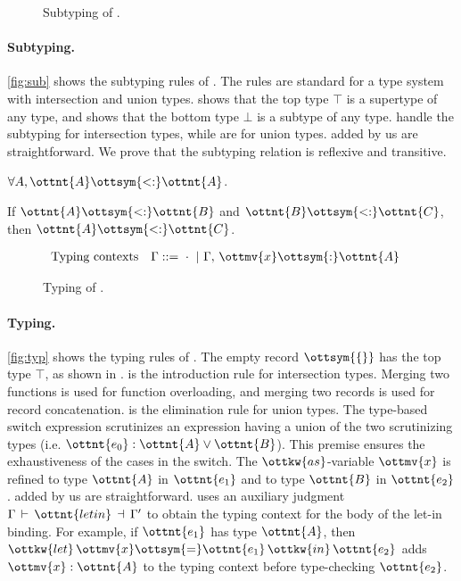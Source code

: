 \begin{figure}
\IUdefnsub{}
\caption{Subtyping of \lambdaiu.} \label{fig:sub}
\end{figure}

\paragraph{Subtyping.}
\autoref{fig:sub} shows the subtyping rules of \lambdaiu. The rules are standard
for a type system with intersection and union types.  shows that
the top type $ \top $ is a supertype of any type, and  shows that
the bottom type $ \bot $ is a subtype of any type.
 handle the subtyping for intersection types,
while  are for union types. 
added by us are straightforward. We prove that the subtyping relation is
reflexive and transitive.

\begin{theorem}
  $\forall A, \ottnt{A}  \ottsym{<:}  \ottnt{A}$.
\end{theorem}
\begin{theorem}
  If $\ottnt{A}  \ottsym{<:}  \ottnt{B}$ and $\ottnt{B}  \ottsym{<:}  \ottnt{C}$, then $\ottnt{A}  \ottsym{<:}  \ottnt{C}$.
\end{theorem}

\begin{figure}
\begin{align*}
  &\text{Typing contexts}&\Gamma ::=&~  \cdot  ~|~ \Gamma  ,\,  \ottmv{x}  \ottsym{:}  \ottnt{A}
\end{align*}
\IUdefntyping{}
\IUdefnletbind{}
\caption{Typing of \lambdaiu.} \label{fig:typ}
\end{figure}

\paragraph{Typing.}
\autoref{fig:typ} shows the typing rules of \lambdaiu. The empty record $\ottsym{\{\}}$
has the top type $ \top $, as shown in .  is the
introduction rule for intersection types. Merging two functions is used for
function overloading, and merging two records is used for record concatenation.
 is the elimination rule for union types. The type-based switch
expression scrutinizes an expression having a union of the two scrutinizing
types (i.e. $\ottnt{e_{{\mathrm{0}}}}:\ottnt{A}  \lor  \ottnt{B}$). This premise ensures the exhaustiveness of the
cases in the switch. The $\ottkw{as}$-variable $\ottmv{x}$ is refined to type
$\ottnt{A}$ in $\ottnt{e_{{\mathrm{1}}}}$ and to type $\ottnt{B}$ in $\ottnt{e_{{\mathrm{2}}}}$.
 added by us are straightforward. 
uses an auxiliary judgment $\Gamma  \,\vdash\,  \ottnt{letin}  \,\dashv\,  \Gamma'$ to obtain the typing context
for the body of the let-in binding. For example, if $\ottnt{e_{{\mathrm{1}}}}$ has type $\ottnt{A}$,
then $\ottkw{let} \, \ottmv{x}  \ottsym{=}  \ottnt{e_{{\mathrm{1}}}} \, \ottkw{in} \, \ottnt{e_{{\mathrm{2}}}}$ adds $\ottmv{x}:\ottnt{A}$ to the typing context before
type-checking $\ottnt{e_{{\mathrm{2}}}}$.

